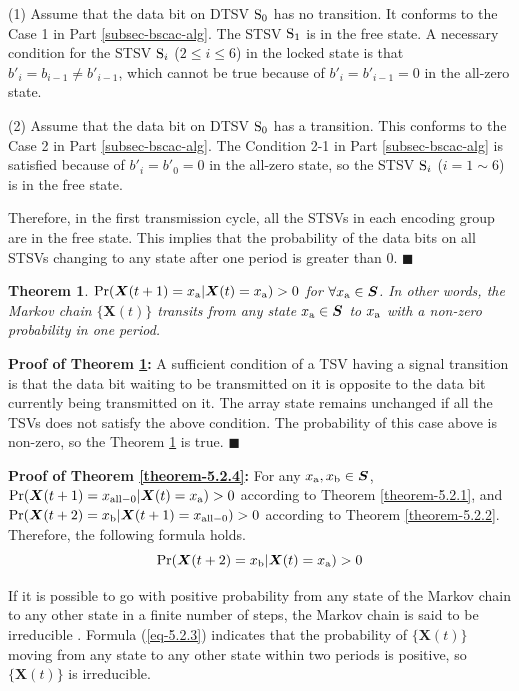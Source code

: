 \documentclass[lettersize,journal]{IEEEtran}
\newtheorem{theorem}{Theorem}
\newcommand{\qedblacksquare}{\hfill $\blacksquare$}
\begin{document}
{(1) Assume that the data bit on DTSV ${\rm S}_0$ has no transition. It conforms to the Case 1 in Part \ref{subsec-bscac-alg}. The STSV ${\rm S}_1$ is in the free state. A necessary condition for the STSV ${\rm S}_i$ ($2\leq i\leq 6$) in the locked state is that ${b'}_i=b_{i-1}\neq {b'}_{i-1}$, which cannot be true because of ${b'}_i={b'}_{i-1}=0$  in the all-zero state.

(2) Assume that the data bit on DTSV ${\rm S}_0$ has a transition. This conforms to the Case 2 in Part \ref{subsec-bscac-alg}. The Condition 2-1 in Part \ref{subsec-bscac-alg} is satisfied because of ${b'}_i={b'}_0= 0$ in the all-zero state, so the STSV ${\rm S}_i$ ($i = 1\sim6$) is in the free state.

Therefore, in the first transmission cycle, all the STSVs in each encoding group are in the free state. This implies that the probability of the data bits on all STSVs changing to any state after one period is greater than 0. \qedblacksquare
\begin{theorem}\label{theorem-5.2.3}
	${\rm Pr}( \boldsymbol{X}(t+1) = x_{\rm a} | \boldsymbol{X}(t) = x_{\rm a})>0$ for $\forall x_{\rm a}\in \boldsymbol{S}$. In other words, the Markov chain $\{\boldsymbol{X}(t)\}$  transits from any state $x_{\rm a}\in \boldsymbol{S}$ to $x_{\rm a}$ with a non-zero probability in one period.
\end{theorem}

\noindent \textbf{Proof of Theorem \ref{theorem-5.2.3}:} A sufficient condition of a TSV having a signal transition is that the data bit waiting to be transmitted on it is opposite to the data bit currently being transmitted on it. The array state remains unchanged if all the TSVs does not satisfy the above condition. The probability of this case above is non-zero, so the Theorem \ref{theorem-5.2.3} is true. \qedblacksquare

\noindent \textbf{Proof of Theorem \ref{theorem-5.2.4}:} For any $x_{\rm a}, x_{\rm b} \in \boldsymbol{S}$, ${\rm Pr}( \boldsymbol{X}(t+1) = x_{\rm all-0} | \boldsymbol{X}(t) = x_{\rm a}) > 0$ according to Theorem \ref{theorem-5.2.1}, and ${\rm Pr}( \boldsymbol{X}(t+2) = x_{\rm b} | \boldsymbol{X}(t+1) = x_{\rm all-0}) > 0$ according to Theorem \ref{theorem-5.2.2}. Therefore, the following formula holds.
\begin{equation}
	{\rm Pr}( \boldsymbol{X}(t+2) = x_{\rm b} | \boldsymbol{X}(t) = x_{\rm a}) > 0
	\label{eq-5.2.3}
\end{equation}

If it is possible to go with positive probability from any state of the Markov chain to any other state in a finite number of steps, the Markov chain is said to be irreducible \cite{A27_book_ElementOfInformationTheory}. Formula (\ref{eq-5.2.3}) indicates that the probability of $\{\boldsymbol{X}(t)\}$ moving from any state to any other state within two periods is positive, so $\{\boldsymbol{X}(t)\}$ is irreducible.

}
\end{document}
